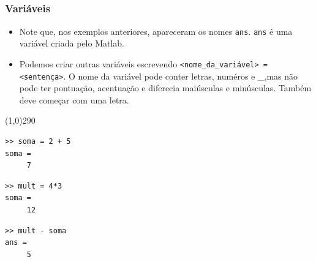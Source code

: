 \documentclass{beamer}
\newcommand{\delim}{\line(1,0){290}}
\begin{document}
\subsection[Elementos B\'asicos]{}

\begin{frame}[fragile]
  \frametitle{Vari\'aveis}
  
  \begin{itemize}
  \item<1-> Note que, nos exemplos anteriores, apareceram os nomes {\tt ans}. {\tt ans} \'e uma vari\'avel criada pelo Matlab.

  \item<2-> Podemos criar outras vari\'aveis escrevendo {\tt <nome\_da\_vari\'avel> = <senten\c{c}a>}. O nome da vari\'avel pode conter letras, num\'eros e \_,mas n\~ao pode ter pontua\c{c}\~ao, acentua\c{c}\~ao e diferecia mai\'usculas e min\'usculas. Tamb\'em deve come\c{c}ar com uma letra.
  \end{itemize}
  \pause \pause
  \delim
  \begin{center}
  \begin{minipage}{4 cm}
  \begin{verbatim}
>> soma = 2 + 5
soma =
     7
  \end{verbatim}
  \end{minipage}
  \begin{minipage}{4 cm}
  \begin{verbatim}
>> mult = 4*3
soma =
     12
  \end{verbatim}
  \end{minipage}
  
  \begin{minipage}{4 cm}
  \begin{verbatim}
>> mult - soma
ans =
     5
  \end{verbatim}
  \end{minipage}
  \end{center}
    
\end{frame}
\end{document}
